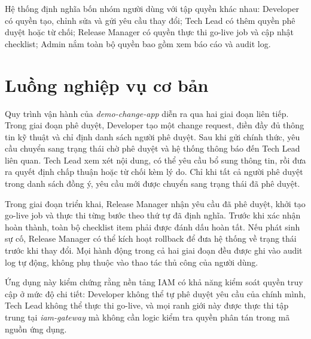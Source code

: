 \documentclass[../DoAn.tex]{subfiles}
\begin{document}
Hệ thống định nghĩa bốn nhóm người dùng với tập quyền khác nhau: Developer có quyền tạo, chỉnh sửa và gửi yêu cầu thay đổi; Tech Lead có thêm quyền phê duyệt hoặc từ chối; Release Manager có quyền thực thi go-live job và cập nhật checklist; Admin nắm toàn bộ quyền bao gồm xem báo cáo và audit log.

\section{Luồng nghiệp vụ cơ bản}

Quy trình vận hành của \textit{demo-change-app} diễn ra qua hai giai đoạn liên tiếp. Trong giai đoạn phê duyệt, Developer tạo một change request, điền đầy đủ thông tin kỹ thuật và chỉ định danh sách người phê duyệt. Sau khi gửi chính thức, yêu cầu chuyển sang trạng thái chờ phê duyệt và hệ thống thông báo đến Tech Lead liên quan. Tech Lead xem xét nội dung, có thể yêu cầu bổ sung thông tin, rồi đưa ra quyết định chấp thuận hoặc từ chối kèm lý do. Chỉ khi tất cả người phê duyệt trong danh sách đồng ý, yêu cầu mới được chuyển sang trạng thái đã phê duyệt.

Trong giai đoạn triển khai, Release Manager nhận yêu cầu đã phê duyệt, khởi tạo go-live job và thực thi từng bước theo thứ tự đã định nghĩa. Trước khi xác nhận hoàn thành, toàn bộ checklist item phải được đánh dấu hoàn tất. Nếu phát sinh sự cố, Release Manager có thể kích hoạt rollback để đưa hệ thống về trạng thái trước khi thay đổi. Mọi hành động trong cả hai giai đoạn đều được ghi vào audit log tự động, không phụ thuộc vào thao tác thủ công của người dùng.

Ứng dụng này kiểm chứng rằng nền tảng IAM có khả năng kiểm soát quyền truy cập ở mức độ chi tiết: Developer không thể tự phê duyệt yêu cầu của chính mình, Tech Lead không thể thực thi go-live, và mọi ranh giới này được thực thi tập trung tại \textit{iam-gateway} mà không cần logic kiểm tra quyền phân tán trong mã nguồn ứng dụng.
\end{document}
